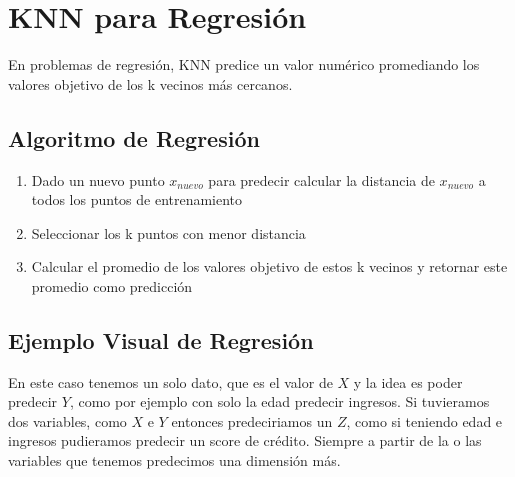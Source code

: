\documentclass[12pt]{article}
\begin{document}
\section{KNN para Regresión}

En problemas de regresión, KNN predice un valor numérico promediando los valores objetivo de los k vecinos más cercanos.

\subsection{Algoritmo de Regresión}

\begin{enumerate}
    \item Dado un nuevo punto $x_{nuevo}$ para predecir calcular la distancia de $x_{nuevo}$ a todos los puntos de entrenamiento
    \item Seleccionar los k puntos con menor distancia
    \item Calcular el promedio de los valores objetivo de estos k vecinos y retornar este promedio como predicción
\end{enumerate}

\subsection{Ejemplo Visual de Regresión}

En este caso tenemos un solo dato, que es el valor de $X$ y la idea es poder predecir $Y$, como por ejemplo con solo la edad predecir ingresos. Si tuvieramos dos variables, como $X$ e $Y$ entonces predeciriamos un $Z$, como si teniendo edad e ingresos pudieramos predecir un score de crédito. Siempre a partir de la o las variables que tenemos predecimos una dimensión más.
\end{document}
